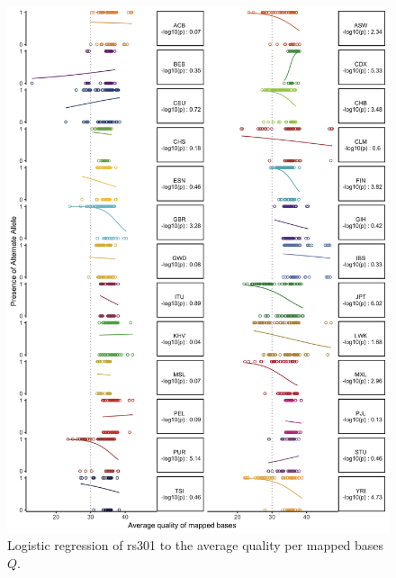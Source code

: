 \documentclass[9pt,lineno]{elife}
\begin{document}
\begin{figure}[h]
\includegraphics[width=\hsize,keepaspectratio]{./Figures/RegressionPlot_diabetes.jpg}
\caption{Logistic regression of rs301 to the average quality per mapped bases $Q$.}
\label{DiabetesSNP}
\end{figure}
\end{document}
